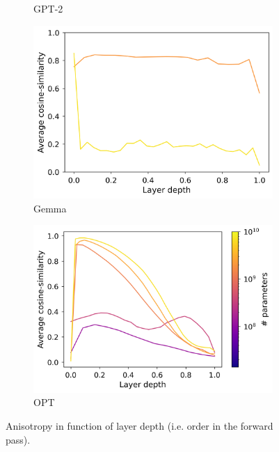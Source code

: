 \begin{figure}[h]
\begin{subfigure}{0.33\columnwidth}
         \caption{GPT-2}
         \label{fig:gpt2_aniso}
    \end{subfigure}
    \begin{subfigure}{0.33\columnwidth}
         \includegraphics[width=\linewidth]{sources/part_1/softmax_bottleneck/imgs/gemma_anisotropy.png}
         \caption{Gemma}
         \label{fig:gemma_aniso}
    \end{subfigure}
    \begin{subfigure}{0.34\columnwidth}
         \includegraphics[width=\linewidth]{sources/part_1/softmax_bottleneck/imgs/opt_anisotropy.png}
         \caption{OPT}
         \label{fig:opt_aniso}
    \end{subfigure}
    \caption{Anisotropy in function of layer depth (i.e. order in the forward pass).}
    \label{fig:anisotropy}
\end{figure}

